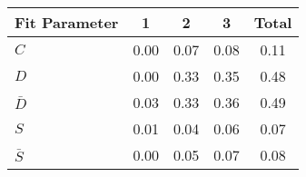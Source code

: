 \begin{tabular}{l  c  c  c  c }
\hline
Fit Parameter & 1 & 2 & 3 &  Total  \\ 
\hline
\hline
$C$ & 0.00 & 0.07 & 0.08 & 0.11 \\ 
$D$ & 0.00 & 0.33 & 0.35 & 0.48 \\ 
$\bar{D}$ & 0.03 & 0.33 & 0.36 & 0.49 \\ 
$S$ & 0.01 & 0.04 & 0.06 & 0.07 \\ 
$\bar{S}$ & 0.00 & 0.05 & 0.07 & 0.08 \\ 
\hline
\end{tabular}
